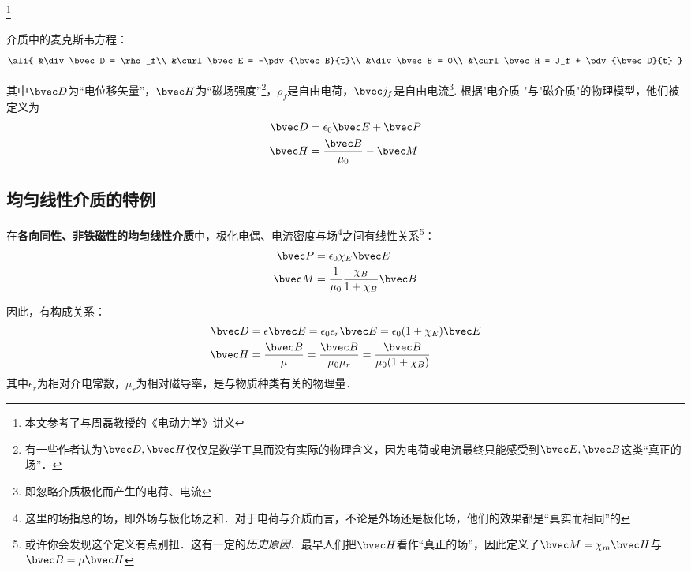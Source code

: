 
\footnote{本文参考了\cite{GriffE}与周磊教授的《电动力学》讲义}
\begin{issues}
\issueDraft
\end{issues}

介质中的麦克斯韦方程：
\begin{equation}\ali{
&\div\bvec D = \rho_f\\
&\curl\bvec E = -\pdv{\bvec B}{t}\\
&\div\bvec B = 0\\
&\curl\bvec H = J_f + \pdv{\bvec D}{t}
}\end{equation}

其中$\bvec D$为“电位移矢量”，$\bvec H$为“磁场强度”\footnote{有一些作者认为$\bvec D, \bvec H$仅仅是数学工具而没有实际的物理含义，因为电荷或电流最终只能感受到$\bvec E, \bvec B$这类“真正的场”．}，$\rho_f$是自由电荷，$\bvec j_f$是自由电流\footnote{即忽略介质极化而产生的电荷、电流}. 根据"电介质  "与"磁介质"的物理模型，他们被定义为
\begin{align}
\bvec D &= \epsilon_0 \bvec E + \bvec P\\
\bvec H &= \frac{\bvec B}{\mu_0} - \bvec M\\
\end{align}

\subsection{均匀线性介质的特例}
在\textbf{各向同性、非铁磁性的均匀线性介质}中，极化电偶、电流密度与场\footnote{这里的场指总的场，即外场与极化场之和．对于电荷与介质而言，不论是外场还是极化场，他们的效果都是“真实而相同”的}之间有线性关系\footnote{或许你会发现这个定义有点别扭．这有一定的\textsl{历史原因}．最早人们把$\bvec H$看作“真正的场”，因此定义了$\bvec M = \chi_m \bvec H$与$\bvec B = \mu \bvec H$}：
\begin{align}
\bvec P &= \epsilon_0 \chi_E \bvec E\\
\bvec M &= \frac{1}{\mu_0} \frac{\chi_B}{1+\chi_B}\bvec B\\
\end{align}

因此，有构成关系：
\begin{align}
\bvec D &= \epsilon \bvec E = \epsilon_0 \epsilon_r \bvec E = \epsilon_0(1 + \chi_E)\bvec E\\

\bvec H &= \frac{\bvec B}{\mu} = \frac{\bvec B}{\mu_0\mu_r} = \frac{\bvec B}{\mu_0(1 + \chi_B)}\\
\end{align}
其中$\epsilon_r$为相对介电常数，$\mu_r$为相对磁导率，是与物质种类有关的物理量．

